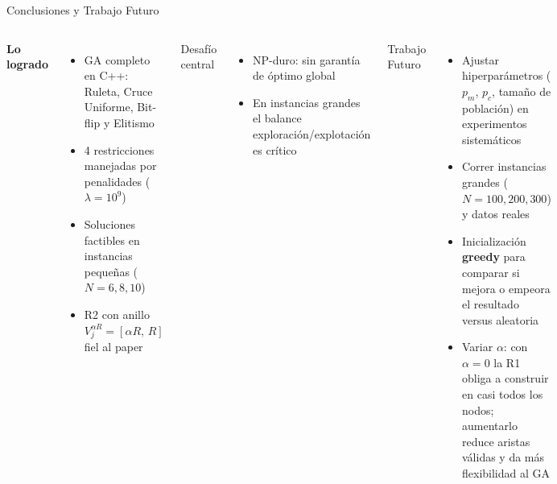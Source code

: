 \documentclass[aspectratio=169, 12pt]{beamer}
\newcommand{\acento}[1]{\textcolor{Verde}{\textbf{#1}}}
\newcommand{\acentob}[1]{\textcolor{Cian}{#1}}
\begin{document}
\begin{frame}{Conclusiones y Trabajo Futuro}
  \begin{columns}[T]
    \acento{Lo logrado}
    \begin{itemize}\footnotesize
      \item[\acento{\checkmark}] GA completo en C++: Ruleta, Cruce Uniforme, Bit-flip y Elitismo
      \item[\acento{\checkmark}] 4 restricciones manejadas por penalidades ($\lambda = 10^9$)
      \item[\acento{\checkmark}] Soluciones factibles en instancias pequeñas ($N{=}6,8,10$)
      \item[\acento{\checkmark}] R2 con anillo $V_j^{\alpha R}=[\alpha R,\,R]$ fiel al paper
    \end{itemize}

    \acentob{Desafío central}
    \begin{itemize}\footnotesize
      \item NP-duro: sin garantía de óptimo global
      \item En instancias grandes el balance exploración/explotación es crítico
    \end{itemize}

    \acentob{Trabajo Futuro}
    \begin{itemize}\footnotesize
      \item[\acentob{$\to$}] Ajustar hiperparámetros ($p_m$, $p_c$, tamaño de población) en experimentos sistemáticos
      \item[\acentob{$\to$}] Correr instancias grandes ($N{=}100,200,300$) y datos reales
      \item[\acentob{$\to$}] Inicialización \textbf{greedy} para comparar si mejora o empeora el resultado versus aleatoria
      \item[\acentob{$\to$}] Variar $\alpha$: con $\alpha{=}0$ la R1 obliga a construir en casi todos los nodos; aumentarlo reduce aristas válidas y da más flexibilidad al GA
    \end{itemize}
  \end{columns}
\end{frame}
\end{document}
